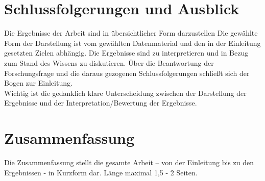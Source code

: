 


\chapter{Schlussfolgerungen und Ausblick}

Die Ergebnisse der Arbeit sind in übersichtlicher Form darzustellen Die gewählte Form der Darstellung ist vom gewählten Datenmaterial und den in 
der Einleitung gesetzten Zielen abhängig. Die Ergebnisse sind zu interpretieren und in Bezug zum Stand des Wissens zu diskutieren. 
Über die Beantwortung der Forschungsfrage und die daraus gezogenen Schlussfolgerungen schließt sich der Bogen zur Einleitung.\\
Wichtig ist die gedanklich klare Unterscheidung zwischen der Darstellung der Ergebnisse und der Interpretation/Bewertung der Ergebnisse.


\chapter{Zusammenfassung}
Die Zusammenfassung stellt die gesamte Arbeit – von der Einleitung bis zu den Ergebnissen - in Kurzform dar. Länge maximal 1,5 - 2 Seiten.